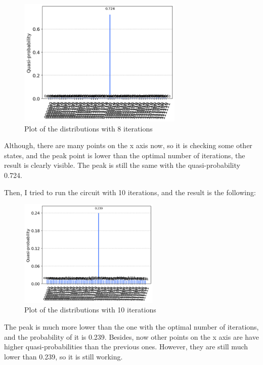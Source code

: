 \documentclass[12pt]{article}
\begin{document}
\begin{figure}[H]
    \centering
    \includegraphics[width=0.7\textwidth]{distribution8.png}
    \caption{Plot of the distributions with 8 iterations}
\end{figure}

Although, there are many points on the x axis now, so it is checking some other states, and the peak point is lower than the optimal number of iterations, the result is clearly visible. The peak is still the same with the quasi-probability 0.724.

\newpage

Then, I tried to run the circuit with 10 iterations, and the result is the following:

\begin{figure}[H]
    \centering
    \includegraphics[width=0.6\textwidth]{distribution10.png}
    \caption{Plot of the distributions with 10 iterations}
\end{figure}

The peak is much more lower than the one with the optimal number of iterations, and the probability of it is 0.239. Besides, now other points on the x axis are have higher quasi-probabilities than the previous ones. However, they are still much lower than 0.239, so it is still working.
\end{document}
